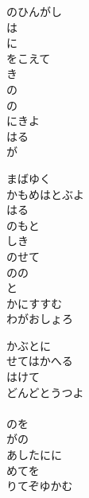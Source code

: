 \documentclass[10pt,b5j]{tarticle} %
\begin{document}
\vspace{1.5em} %
\newcommand{\linespace}{0.5em} %
\newcommand{\blocksize}{0.5\hsize} %
\begin{enumerate} %
    \begin{minipage}[c]{\blocksize}
    
        \vspace{\linespace}
        \item
        のひんがし\\
        は\\
        に\\
        をこえて\\
        き\\
        の\\
        の\\
        にきよ\\
        はる\\
        が
        
        \vspace{\linespace}
        \item
        まばゆく\\
        かもめはとぶよ\\
        はる\\
        のもと\\
        しき\\
        のせて\\
        のの\\
        と\\
        かにすすむ\\
        わがおしょろ
        
        \vspace{\linespace}
        \item
        かぶとに\\
        せてはかへる\\
        はけて\\
        どんどとうつよ\\
        \\
        のを\\
        がの\\
        あしたにに\\
        めてを\\
        りてぞゆかむ
        

\end{minipage}
\end{enumerate}
\end{document}
